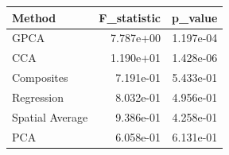 \begin{tabular}{lrr}
\toprule
Method & F_statistic & p_value \\
\midrule
GPCA & 7.787e+00 & 1.197e-04 \\
CCA & 1.190e+01 & 1.428e-06 \\
Composites & 7.191e-01 & 5.433e-01 \\
Regression & 8.032e-01 & 4.956e-01 \\
Spatial Average & 9.386e-01 & 4.258e-01 \\
PCA & 6.058e-01 & 6.131e-01 \\
\bottomrule
\end{tabular}
